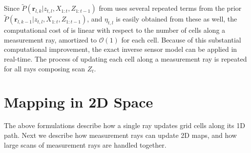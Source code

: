

Since $\tilde P(\mathbf{r}_{l,k}|z_{t,l},X_{1:t},Z_{1:t-1})$ from  uses several repeated terms from the prior $\tilde P(\mathbf{r}_{l,k-1}|z_{t,l},X_{1:t},Z_{1:t-1})$, and $\eta_{t,l}$ is easily obtained from these as well, the computational cost of  is linear with respect to the number of cells along a measurement ray, amortized to $\mathcal{O}(1)$ for each cell. Because of this substantial computational improvement, the exact inverse sensor model can be applied in real-time. The process of updating each cell along a measurement ray is repeated for all rays composing scan $Z_t$.



\section{Mapping in 2D Space}

The above formulations describe how a single ray updates grid cells along its 1D path. Next we describe how measurement rays can update 2D maps, and how large scans of measurement rays are handled together.

